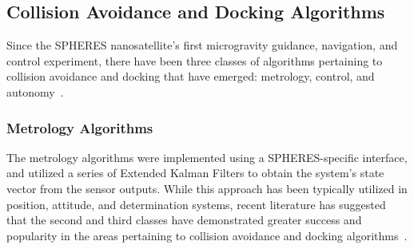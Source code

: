 \documentclass[journal, 10pt]{IEEEtran}
\begin{document}
\subsection{Collision Avoidance and Docking Algorithms}
Since the SPHERES nanosatellite's first microgravity guidance, navigation, and control experiment, there have been three classes of algorithms pertaining to collision avoidance and docking that have emerged: metrology, control, and autonomy~\cite{SPHERES_form}.

\subsubsection{Metrology Algorithms}
The metrology algorithms were implemented using a SPHERES-specific interface, and utilized a series of Extended Kalman Filters to obtain the system's state vector from the sensor outputs. While this approach has been typically utilized in position, attitude, and determination systems, recent literature has suggested that the second and third classes have demonstrated greater success and popularity in the areas pertaining to collision avoidance and docking algorithms~\cite{SPHERES_form}.
\end{document}
